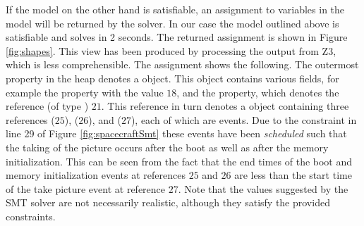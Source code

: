 If the model on the other hand is satisfiable, an assignment to
variables in the model will be returned by the solver. In our case the
model outlined above is satisfiable and solves in 2 seconds. 
The returned assignment is shown
in Figure \ref{fig:shapes}. This view has been produced by processing
the output from Z3, which is less comprehensible.
%
The assignment shows the following. The outermost 
property in the heap denotes a  object.  This object
contains various fields, for example the  property with
the value $18$, and the  property, which denotes the
reference (of type ) $21$. This reference in turn denotes a
 object containing three references 
($25$),  ($26$), and  ($27$), each of
which are events. Due to the constraint in line 29 of Figure
\ref{fig:spacecraftSmt} these events have been {\em scheduled} such
that the taking of the picture occurs after the boot as well as after
the memory initialization.  This can be seen from the fact that the
end times of the boot and memory initialization events at references
$25$ and $26$ are less than the start time of the take picture event
at reference $27$. Note that the values suggested by the SMT solver 
are not necessarily realistic, although they satisfy the provided
constraints.

\lstset{language=K}
